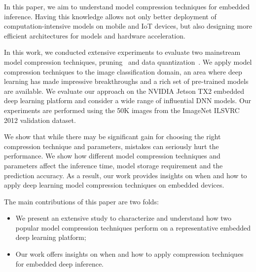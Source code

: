 In this paper, we aim to understand model compression techniques for embedded inference. Having this knowledge allows not only better
deployment of computation-intensive models on mobile and IoT devices, but also designing more efficient architectures for models and
hardware acceleration.

In this work, we conducted extensive experiments to evaluate two mainstream model compression techniques, pruning~\cite{} and data
quantization~\cite{}. We apply model compression techniques to the image classification domain, an area where deep learning has made
impressive breakthroughs and a rich set of pre-trained models are available. We evaluate our approach on the NVIDIA Jetson TX2 embedded
deep learning platform and consider a wide range of influential DNN models. Our experiments are performed using the 50K images from the
ImageNet ILSVRC 2012 validation dataset.

We show that while there may be significant gain for choosing the right compression technique and parameters, mistakes can seriously hurt
the performance. We show how different model compression techniques and parameters affect the inference time, model storage requirement and
the prediction accuracy. As a result, our work provides insights on when and how to apply deep learning model compression techniques on
embedded devices.

The main contributions of this paper are two folds:

\begin{itemize}
\item We present an extensive study to characterize and understand how two popular model compression techniques perform on a
    representative embedded deep learning platform;
\item Our work offers insights on when and how to apply compression techniques for embedded deep inference.
\end{itemize}
